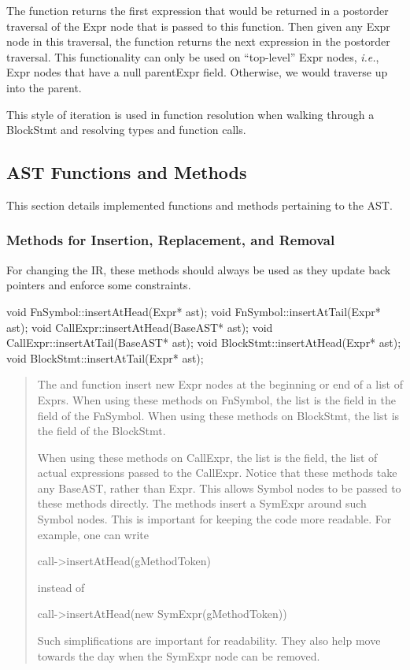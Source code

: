 \documentclass[10pt]{article}
\newcommand{\ie}{\emph{i.e.}}
\begin{document}
The function  returns the first expression that would
be returned in a postorder traversal of the Expr node that is passed
to this function.  Then given any Expr node in this traversal, the
function  returns the next expression in the postorder
traversal.  This functionality can only be used on ``top-level'' Expr
nodes, \ie, Expr nodes that have a null parentExpr field.  Otherwise,
we would traverse up into the parent.

This style of iteration is used in function resolution when walking
through a BlockStmt and resolving types and function calls.

\subsection{AST Functions and Methods}

This section details implemented functions and methods pertaining to
the AST.

\subsubsection{Methods for Insertion, Replacement, and Removal}
\label{sec:inserts}

For changing the IR, these methods should always be used as they
update back pointers and enforce some constraints.

\begin{clang}
void FnSymbol::insertAtHead(Expr* ast);
void FnSymbol::insertAtTail(Expr* ast);
void CallExpr::insertAtHead(BaseAST* ast);
void CallExpr::insertAtTail(BaseAST* ast);
void BlockStmt::insertAtHead(Expr* ast);
void BlockStmt::insertAtTail(Expr* ast);
\end{clang}
\begin{quote}
The  and  function insert new
Expr nodes at the beginning or end of a list of Exprs.  When using
these methods on FnSymbol, the list is the  field in the
 field of the FnSymbol.  When using these methods
on BlockStmt, the list is the  field of the BlockStmt.

When using these methods on CallExpr, the list is the 
field, the list of actual expressions passed to the CallExpr.  Notice
that these methods take any BaseAST, rather than Expr.  This allows
Symbol nodes to be passed to these methods directly.  The methods
insert a SymExpr around such Symbol nodes.  This is important for
keeping the code more readable.  For example, one can write
\begin{clang}
call->insertAtHead(gMethodToken)
\end{clang}
instead of
\begin{clang}
call->insertAtHead(new SymExpr(gMethodToken))
\end{clang}
Such simplifications are important for readability.  They also help
move towards the day when the SymExpr node can be removed.
\end{quote}
\end{document}
